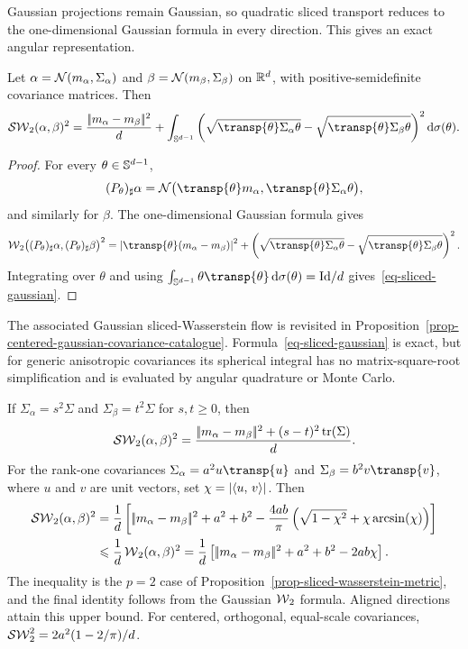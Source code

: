 Gaussian projections remain Gaussian, so quadratic sliced transport reduces
to the one-dimensional Gaussian formula in every direction. This gives an
exact angular representation.

\begin{prop}\label{prop-sliced-gaussian}
	Let $\alpha=\mathcal{N}(m_\alpha,\Sigma_\alpha)$ and
	$\beta=\mathcal{N}(m_\beta,\Sigma_\beta)$ on $\mathbb{R}^d$, with positive-semidefinite
	covariance matrices. Then
	\begin{equation}\label{eq-sliced-gaussian}
		\SW_2(\alpha,\beta)^2
		=
		\frac{\norm{m_\alpha-m_\beta}^2}{d}
		+
		\int_{\Sphere^{d-1}}
		\pa{
			\sqrt{\transp{\theta}\Sigma_\alpha\theta}
			-
			\sqrt{\transp{\theta}\Sigma_\beta\theta}
		}^2
		\d\sigma(\theta).
	\end{equation}
\end{prop}
\begin{proof}
	For every $\theta\in\mathbb{S}^{d-1}$,
	\[
		(P_\theta)_\sharp\alpha
		=
		\Gaussian\bigl(\transp{\theta}m_\alpha,
		\transp{\theta}\Sigma_\alpha\theta\bigr),
	\]
	and similarly for $\beta$. The one-dimensional Gaussian formula gives
	\[
		\Wass_2\bigl((P_\theta)_\sharp\alpha,
		(P_\theta)_\sharp\beta\bigr)^2
		=
		\abs{\transp{\theta}(m_\alpha-m_\beta)}^2
		+
		\pa{
			\sqrt{\transp{\theta}\Sigma_\alpha\theta}
			-
			\sqrt{\transp{\theta}\Sigma_\beta\theta}
		}^2.
	\]
	Integrating over $\theta$ and using
	$\int_{\Sphere^{d-1}}\theta\transp{\theta}\,\d\sigma(\theta)=\Id/d$
	gives~\eqref{eq-sliced-gaussian}.
\end{proof}

The associated Gaussian sliced-Wasserstein flow is revisited in
Proposition~\ref{prop-centered-gaussian-covariance-catalogue}.
Formula~\eqref{eq-sliced-gaussian} is exact, but for generic anisotropic
covariances its spherical integral has no matrix-square-root simplification
and is evaluated by angular quadrature or Monte Carlo.

\begin{rem}\label{rem-sliced-gaussian-special-cases}
	If $\Sigma_\alpha=s^2\Sigma$ and $\Sigma_\beta=t^2\Sigma$ for
	$s,t\geq0$, then
	\[
		\operatorname{\mathcal{SW}}_2(\alpha,\beta)^2
		=
		\frac{|\!| m_\alpha-m_\beta |\!|^2+(s-t)^2\operatorname{tr}(\Sigma)}{d}.
	\]
	For the rank-one covariances
	$\Sigma_\alpha=a^2u\transp{u}$ and
	$\Sigma_\beta=b^2v\transp{v}$, where $u$ and $v$ are unit vectors, set
	$\chi=\left\lvert\langle u,\,v\rangle\right\rvert$. Then
	\[
	\begin{aligned}
		\operatorname{\mathcal{SW}}_2(\alpha,\beta)^2
		&=
		\frac1d\left[
		|\!| m_\alpha-m_\beta |\!|^2+a^2+b^2
		-\frac{4ab}{\pi}
		\left( \sqrt{1-\chi^2}+\chi\arcsin(\chi) \right)
		\right] \\
		&\leqslant
		\frac1d\operatorname{\mathcal{W}}_2(\alpha,\beta)^2
		=
		\frac1d\left[
		|\!| m_\alpha-m_\beta |\!|^2+a^2+b^2-2ab\chi
		\right].
	\end{aligned}
	\]
	The inequality is the $p=2$ case of
	Proposition~\ref{prop-sliced-wasserstein-metric}, and the final identity
	follows from the Gaussian $\operatorname{\mathcal{W}}_2$ formula.
	Aligned directions attain this upper bound. For centered, orthogonal,
	equal-scale covariances, $\operatorname{\mathcal{SW}}_2^2=2a^2(1-2/\pi)/d$.
\end{rem}

